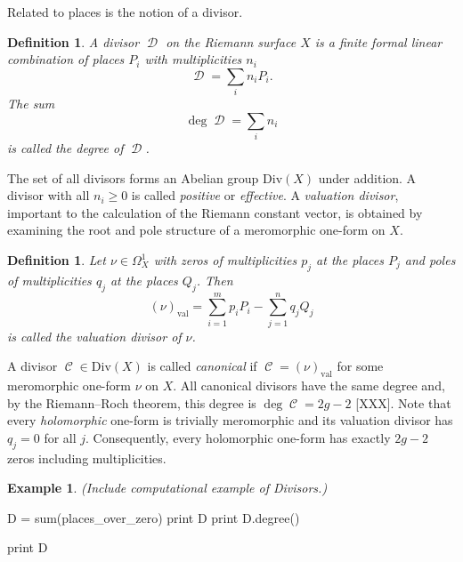 \documentclass[12pt]{article}
\newtheorem{definition}[theorem]{Definition}
\theoremstyle{definition}
\newtheorem{example}[theorem]{Example}
\DeclareMathOperator{\DivC}{\mathcal{C}}
\DeclareMathOperator{\DivD}{\mathcal{D}}
\begin{document}
Related to places is the notion of a divisor.
\begin{definition} \label{def:divisor}
A divisor $\DivD$ on the Riemann surface $X$ is a finite formal linear
combination of places $P_i$ with multiplicities $n_i$
\begin{equation}
\DivD = \sum_i n_i P_i.
\end{equation}
The sum
\begin{equation}
\deg \DivD = \sum_i n_i
\end{equation}
is called the degree of $\DivD$.
\end{definition}
The set of all divisors forms an Abelian group $\text{Div}(X)$ under
addition. A divisor with all $n_i \geq 0$ is called {\it positive} or
{\it effective}. A {\it valuation divisor}, important to the calculation
of the Riemann constant vector, is obtained by examining the root and
pole structure of a meromorphic one-form on $X$.
\begin{definition} \label{def:valuationdivisor}
Let $\nu \in \Omega_X^1$ with zeros of multiplicities $p_j$ at the
places $P_j$ and poles of multiplicities $q_j$ at the places $Q_j$. Then
\begin{equation} \label{eqn: valuation divisor}
  (\nu)_\text{val} = \sum_{i=1}^m p_iP_i - \sum_{j=1}^n q_jQ_j
\end{equation}
is called the valuation divisor of $\nu$.
\end{definition}
A divisor $\DivC \in \text{Div}(X)$ is called {\it canonical} if $\DivC
= (\nu)_\text{val}$ for some meromorphic one-form $\nu$ on $X$. All
canonical divisors have the same degree and, by the Riemann--Roch
theorem, this degree is $\deg \DivC = 2g - 2$ [XXX]. Note that every
{\it holomorphic} one-form is trivially meromorphic and its valuation
divisor has $q_j = 0$ for all $j$. Consequently, every holomorphic
one-form has exactly $2g-2$ zeros including multiplicities.


\begin{example}
  {\it (Include computational example of Divisors.)}
\begin{ipythoninput}
D = sum(places_over_zero)
print D
print D.degree()
\end{ipythoninput}
\begin{ipythonoutput}
[XXX]
\end{ipythonoutput}
\begin{ipythoninput}
print D
\end{ipythoninput}
\begin{ipythonoutput}
[XXX]
\end{ipythonoutput}

\end{example}
\end{document}
